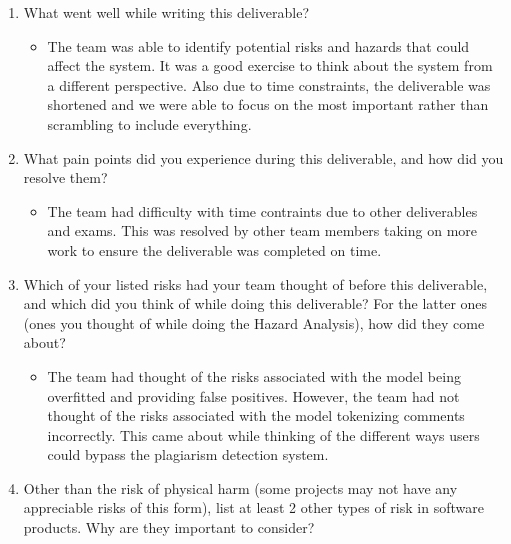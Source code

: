 \documentclass{article}
\begin{document}
\begin{enumerate}
    \item What went well while writing this deliverable? 
    \begin{itemize}
        \item The team was able to identify potential risks and hazards that could affect the system. It was a good exercise to think about the 
        system from a different perspective. Also due to time constraints, the deliverable was shortened and we were able to focus on the most 
        important rather than scrambling to include everything.
    \end{itemize}
    \item What pain points did you experience during this deliverable, and how
    did you resolve them?
    \begin{itemize}
        \item The team had difficulty with time contraints due to other deliverables and exams. This was resolved by other team members taking on
        more work to ensure the deliverable was completed on time.
    \end{itemize}
    \item Which of your listed risks had your team thought of before this
    deliverable, and which did you think of while doing this deliverable? For
    the latter ones (ones you thought of while doing the Hazard Analysis), how
    did they come about?
    \begin{itemize}
        \item The team had thought of the risks associated with the model being overfitted and providing false positives. However, the team had not
        thought of the risks associated with the model tokenizing comments incorrectly. This came about while thinking of the different ways
        users could bypass the plagiarism detection system.
    \end{itemize}
    \item Other than the risk of physical harm (some projects may not have any
    appreciable risks of this form), list at least 2 other types of risk in
    software products. Why are they important to consider?
\end{enumerate}
\end{document}
